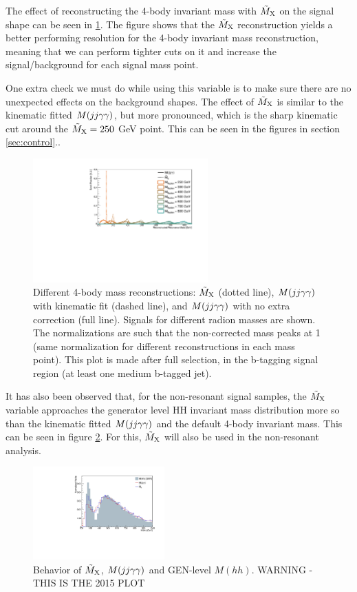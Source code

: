 The effect of reconstructing the 4-body invariant mass with $\tilde{M}_{\mathrm{X}}$ on the signal shape can be seen in \ref{fig:mx}. 
The figure shows that the $\tilde{M}_{\mathrm{X}}$ reconstruction yields a better performing resolution for the 4-body invariant mass reconstruction, meaning that we can perform tighter cuts on it and increase the signal/background for each signal mass point.

One extra check we must do while using this variable is to make sure there are no unexpected effects on the background shapes. 
The effect of $\tilde{M}_{\mathrm{X}}$ is similar to the kinematic fitted $M(jj\gamma\gamma)$, but more pronounced, which is the sharp kinematic cut around the $\tilde{M}_{\mathrm{X}} = 250$ GeV point. This can be seen in the figures in section \ref{sec:control}..

\begin{figure}[h]
  \centering
  \includegraphics[width=0.6\textwidth]{figures/sec-window/prplot.pdf}\hfil
  \caption{Different 4-body mass reconstructions: $\tilde{M}_{\mathrm{X}}$ (dotted line), $M(jj\gamma\gamma)$ with kinematic fit (dashed line), and $M(jj\gamma\gamma)$ with no extra correction (full line). Signals for different radion masses are shown. The normalizations are such that the non-corrected mass peaks at 1 (same normalization for different reconstructions in each mass point). This plot is made after full selection, in the b-tagging signal region (at least one medium b-tagged jet).}
  \label{fig:mx}
\end{figure}

It has also been observed that, for the non-resonant signal samples, the $\tilde{M}_{\mathrm{X}}$ variable approaches the generator level HH invariant mass distribution more so than the kinematic fitted $M(jj\gamma\gamma)$ and the default 4-body invariant mass. This can be seen in figure \ref{fig:mxnonres}. For this, $\tilde{M}_{\mathrm{X}}$ will also be used in the non-resonant analysis.

\begin{figure}[h]
  \centering
  \includegraphics[width=0.45\textwidth]{figures/sec-window/nonresmx.pdf}\hfil
  \caption{Behavior of $\tilde{M}_{\mathrm{X}}$, $M(jj\gamma\gamma)$ and GEN-level $M(hh)$. WARNING - THIS IS THE 2015 PLOT}
  \label{fig:mxnonres}
\end{figure}

